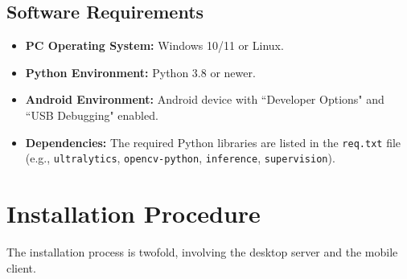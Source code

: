 \subsection{Software Requirements}
\begin{itemize}
    \item \textbf{PC Operating System:} Windows 10/11 or Linux.
    \item \textbf{Python Environment:} Python 3.8 or newer.
    \item \textbf{Android Environment:} Android device with ``Developer Options" and ``USB Debugging" enabled.
    \item \textbf{Dependencies:} The required Python libraries are listed in the \texttt{req.txt} file (e.g., \texttt{ultralytics}, \texttt{opencv-python}, \texttt{inference}, \texttt{supervision}).
\end{itemize}

\section{Installation Procedure}

The installation process is twofold, involving the desktop server and the mobile client.

